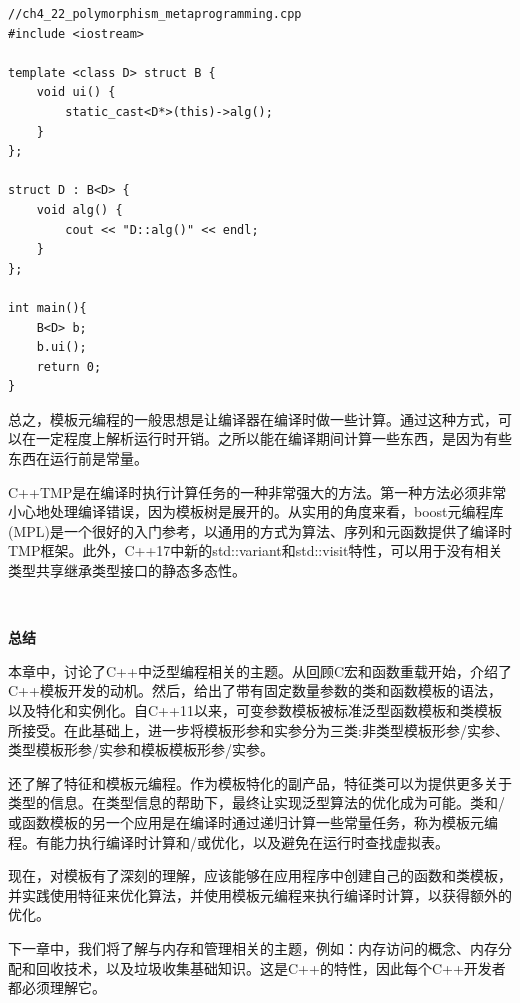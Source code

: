 \begin{lstlisting}[caption={}]
//ch4_22_polymorphism_metaprogramming.cpp
#include <iostream>

template <class D> struct B {
	void ui() {
		static_cast<D*>(this)->alg();
	}
};

struct D : B<D> {
	void alg() {
		cout << "D::alg()" << endl;
	}
};

int main(){
	B<D> b;
	b.ui();
	return 0;
}	
\end{lstlisting}

总之，模板元编程的一般思想是让编译器在编译时做一些计算。通过这种方式，可以在一定程度上解析运行时开销。之所以能在编译期间计算一些东西，是因为有些东西在运行前是常量。 \par
C++TMP是在编译时执行计算任务的一种非常强大的方法。第一种方法必须非常小心地处理编译错误，因为模板树是展开的。从实用的角度来看，boost元编程库(MPL)是一个很好的入门参考，以通用的方式为算法、序列和元函数提供了编译时TMP框架。此外，C++17中新的std::variant和std::visit特性，可以用于没有相关类型共享继承类型接口的静态多态性。 \par

\noindent\textbf{}\ \par
\textbf{总结} \ \par
本章中，讨论了C++中泛型编程相关的主题。从回顾C宏和函数重载开始，介绍了C++模板开发的动机。然后，给出了带有固定数量参数的类和函数模板的语法，以及特化和实例化。自C++11以来，可变参数模板被标准泛型函数模板和类模板所接受。在此基础上，进一步将模板形参和实参分为三类:非类型模板形参/实参、类型模板形参/实参和模板模板形参/实参。 \par
还了解了特征和模板元编程。作为模板特化的副产品，特征类可以为提供更多关于类型的信息。在类型信息的帮助下，最终让实现泛型算法的优化成为可能。类和/或函数模板的另一个应用是在编译时通过递归计算一些常量任务，称为模板元编程。有能力执行编译时计算和/或优化，以及避免在运行时查找虚拟表。 \par
现在，对模板有了深刻的理解，应该能够在应用程序中创建自己的函数和类模板，并实践使用特征来优化算法，并使用模板元编程来执行编译时计算，以获得额外的优化。 \par
下一章中，我们将了解与内存和管理相关的主题，例如：内存访问的概念、内存分配和回收技术，以及垃圾收集基础知识。这是C++的特性，因此每个C++开发者都必须理解它。 \par


